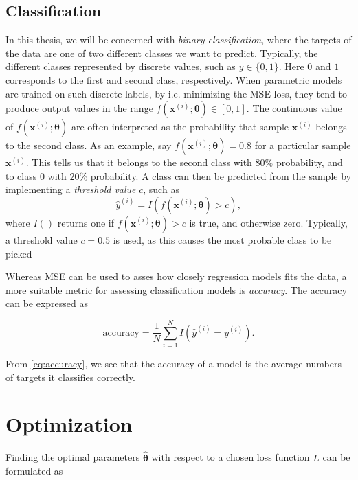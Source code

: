 \subsection{Classification}\label{sec:Classifcation}
In this thesis, we will be concerned with \emph{binary classification}, where the targets of the data are one of two different classes we want to predict. Typically, the different classes represented by discrete values, such as $y \in \{0,1\}$. Here $0$ and $1$ corresponds to the first and second class, respectively. When parametric models are trained on such discrete labels, by i.e.  minimizing the MSE loss, they tend to produce output values in the range $f(\boldsymbol{x}^{(i)}; \boldsymbol{\theta}) \in [0,1]$. The continuous value of $f(\boldsymbol{x}^{(i)}; \boldsymbol{\theta})$ are often interpreted as the probability that sample $\boldsymbol{x}^{(i)}$ belongs to the second class. As an example, say $f(\boldsymbol{x}^{(i)}; \boldsymbol{\theta}) = 0.8$ for a particular sample $\boldsymbol{x}^{(i)}$. This tells us that it belongs to the second class with $80\%$ probability, and to class $0$ with $20\%$ probability. A class can then be predicted from the  sample by implementing a \emph{threshold value} $c$, such as
\begin{equation}
    \hat{y}^{(i)} = I(f(\boldsymbol{x}^{(i)}; \boldsymbol{\theta}) > c),
\end{equation}
where $I()$ returns one if $f(\boldsymbol{x}^{(i)}; \boldsymbol{\theta}) > c$ is true, and otherwise zero. Typically, a threshold value $c = 0.5$ is used, as this causes the most probable class to be picked  

Whereas MSE can be used to asses how closely regression models fits the data, a more suitable metric for assessing classification models is \emph{accuracy}. The accuracy can be expressed as 

\begin{equation}\label{eq:accuracy}
    \text{accuracy} = \frac{1}{N}\sum_{i=1}^{N} I(\hat{y}^{(i)} = y^{(i)}).
\end{equation}

From \cref{eq:accuracy}, we see that the accuracy of a model is the average numbers of targets it classifies correctly.  


\section{Optimization}\label{sec:Optimization}
Finding the optimal parameters $\hat{\boldsymbol{\theta}}$ with respect to a chosen loss function $L$ can be formulated as

